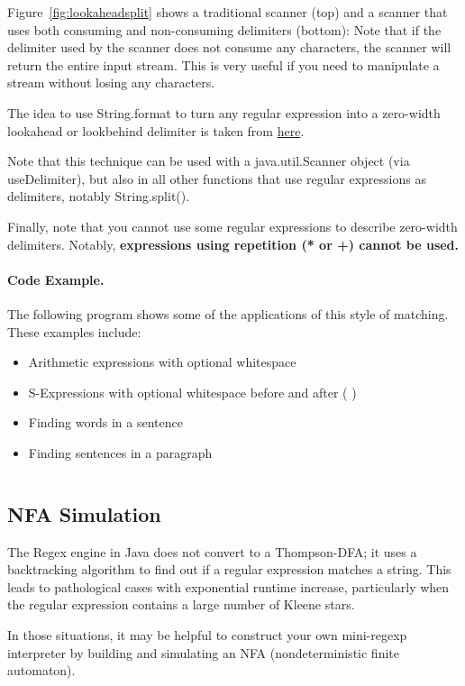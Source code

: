 Figure~\ref{fig:lookaheadsplit} shows a traditional scanner (top) and a scanner that
uses both consuming and non-consuming delimiters (bottom): Note that
if the delimiter used by the scanner does not consume any characters,
the scanner will return the entire input stream. This is very useful if
you need to manipulate a stream without losing any characters.

The idea to use String.format to turn any regular expression into a 
zero-width lookahead or lookbehind delimiter is taken from \href{http://stackoverflow.com/questions/2206378/how-to-split-a-string-but-also-keep-the-delimiters}{here}.

Note that this technique can be used with a java.util.Scanner object
(via useDelimiter), but also in all other functions that use regular
expressions as delimiters, notably String.split().

Finally, note that you cannot use some regular expressions to describe
zero-width delimiters. Notably, \textbf{expressions using repetition (* or +)
cannot be used.}

\paragraph{Code Example.}
The following program shows some of the applications of
this style of matching.  These examples include:
\begin{itemize}
\item Arithmetic expressions with optional whitespace
\item S-Expressions with optional whitespace before and after ( )
\item Finding words in a sentence
\item Finding sentences in a paragraph
\end{itemize}

\inputminted{java}{code/Lookaround.java}

\subsection{NFA Simulation}

The Regex engine in Java does not convert to a Thompson-DFA; it uses a backtracking algorithm
to find out if a regular expression matches a string.  This leads to pathological cases with
exponential runtime increase, particularly when the regular expression contains a large number
of Kleene stars.

In those situations, it may be helpful to construct your own mini-regexp interpreter by building
and simulating an NFA (nondeterministic finite automaton).

